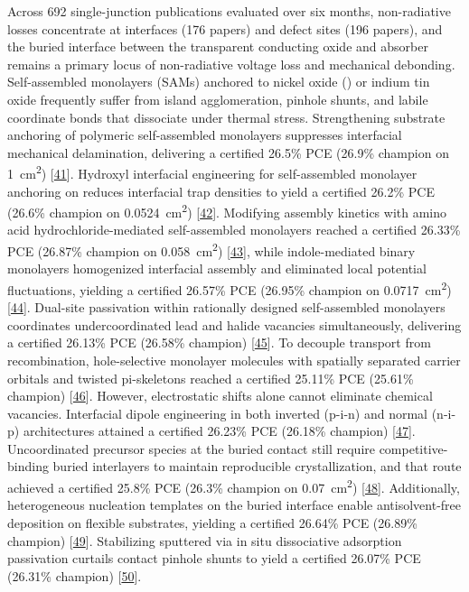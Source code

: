 \documentclass[
  11pt,
]{article}
\begin{document}
Across 692 single-junction publications evaluated over six months,
non-radiative losses concentrate at interfaces (176 papers) and defect
sites (196 papers), and the buried interface between the transparent
conducting oxide and absorber remains a primary locus of non-radiative
voltage loss and mechanical debonding. Self-assembled monolayers (SAMs)
anchored to nickel oxide () or indium tin oxide frequently
suffer from island agglomeration, pinhole shunts, and labile coordinate
bonds that dissociate under thermal stress. Strengthening substrate
anchoring of polymeric self-assembled monolayers suppresses interfacial
mechanical delamination, delivering a certified 26.5\% PCE (26.9\%
champion on \qty{1}{\centi\meter\squared})
{[}\href{https://doi.org/10.1002/adma.72622}{41}{]}. Hydroxyl
interfacial engineering for self-assembled monolayer anchoring on
 reduces interfacial trap densities to yield a certified
26.2\% PCE (26.6\% champion on \qty{0.0524}{\centi\meter\squared})
{[}\href{https://doi.org/10.1002/adma.73656}{42}{]}. Modifying assembly
kinetics with amino acid hydrochloride-mediated self-assembled
monolayers reached a certified 26.33\% PCE (26.87\% champion on
\qty{0.058}{\centi\meter\squared})
{[}\href{https://doi.org/10.1002/aenm.70925}{43}{]}, while
indole-mediated binary monolayers homogenized interfacial assembly and
eliminated local potential fluctuations, yielding a certified 26.57\%
PCE (26.95\% champion on \qty{0.0717}{\centi\meter\squared})
{[}\href{https://doi.org/10.1038/s41467-026-71301-6}{44}{]}. Dual-site
passivation within rationally designed self-assembled monolayers
coordinates undercoordinated lead and halide vacancies simultaneously,
delivering a certified 26.13\% PCE (26.58\% champion)
{[}\href{https://doi.org/10.1002/adma.202523249}{45}{]}. To decouple
transport from recombination, hole-selective monolayer molecules with
spatially separated carrier orbitals and twisted pi-skeletons reached a
certified 25.11\% PCE (25.61\% champion)
{[}\href{https://doi.org/10.1021/acsnano.5c21709}{46}{]}. However,
electrostatic shifts alone cannot eliminate chemical vacancies.
Interfacial dipole engineering in both inverted (p-i-n) and normal
(n-i-p) architectures attained a certified 26.23\% PCE (26.18\%
champion) {[}\href{https://doi.org/10.1038/s41467-026-69198-2}{47}{]}.
Uncoordinated precursor species at the buried contact still require
competitive-binding buried interlayers to maintain reproducible
crystallization, and that route achieved a certified 25.8\% PCE (26.3\%
champion on \qty{0.07}{\centi\meter\squared})
{[}\href{https://doi.org/10.1126/sciadv.aea7629}{48}{]}. Additionally,
heterogeneous nucleation templates on the buried interface enable
antisolvent-free deposition on flexible substrates, yielding a certified
26.64\% PCE (26.89\% champion)
{[}\href{https://doi.org/10.1002/adma.73358}{49}{]}. Stabilizing
sputtered  via in situ dissociative adsorption passivation
curtails contact pinhole shunts to yield a certified 26.07\% PCE
(26.31\% champion) {[}\href{https://doi.org/10.1002/adma.73382}{50}{]}.
\end{document}
